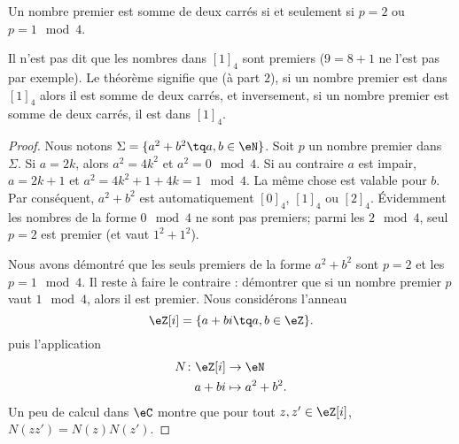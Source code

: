 \begin{theorem}   \label{ThospaAEI}
    Un nombre premier est somme de deux carrés si et seulement si \( p=2\) ou \( p=1\mod 4\).
\end{theorem}


\begin{remark}
    Il n'est pas dit que les nombres dans \( [1]_4\) sont premiers (\( 9=8+1\) ne l'est pas par exemple). Le théorème signifie que (à part \( 2\)), si un nombre premier est dans \( [1]_4\) alors il est somme de deux carrés, et inversement, si un nombre premier est somme de deux carrés, il est dans \( [1]_4\).
\end{remark}

\begin{proof}
    Nous notons \( \Sigma=\{ a^2+b^2\tq a,b\in \eN \}\). Soit \( p\) un nombre premier dans \( \Sigma\). Si \( a=2k\), alors \( a^2=4k^2\) et \( a^2=0\mod 4\). Si au contraire \( a\) est impair, \( a=2k+1\) et \( a^2=4k^2+1+4k=1\mod 4\). La même chose est valable pour \( b\). Par conséquent, \( a^2+b^2\) est automatiquement \( [0]_4\), \( [1]_4\) ou \( [2]_4\). Évidemment les nombres de la forme \( 0\mod 4\) ne sont pas premiers; parmi les \( 2\mod 4\), seul \( p=2\) est premier (et vaut \( 1^2+1^2\)).

    Nous avons démontré que les seuls premiers de la forme \( a^2+b^2\) sont \( p=2\) et les \( p=1\mod 4\). Il reste à faire le contraire : démontrer que si un nombre premier \( p\) vaut \( 1\mod 4\), alors il est premier. Nous considérons l'anneau
    \begin{equation}
        \eZ[i]=\{ a+bi\tq a,b\in \eZ \}.
    \end{equation}
    puis l'application
    \begin{equation}
        \begin{aligned}
            N\colon \eZ[i]&\to \eN \\
            a+bi&\mapsto a^2+b^2. 
        \end{aligned}
    \end{equation}
    Un peu de calcul dans \( \eC\) montre que pour tout \( z,z'\in \eZ[i]\), \( N(zz')=N(z)N(z')\).


\end{proof}
